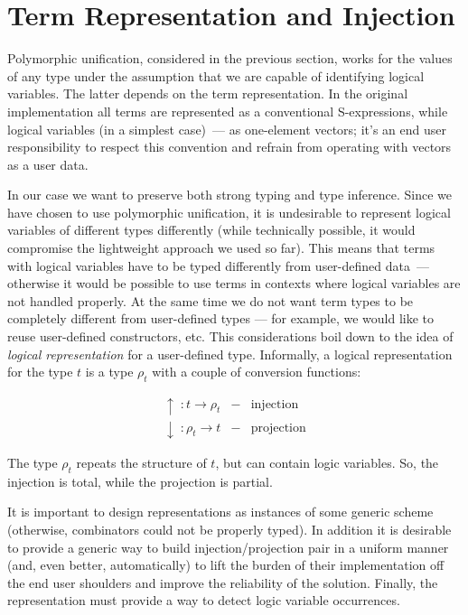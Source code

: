 
\section{Term Representation and Injection}
\label{sec:injection}

Polymorphic unification, considered in the previous section, works for the values of any type under the assumption that we
are capable of identifying logical variables. The latter depends on the term representation. In the original
implementation all terms are represented as a conventional S-expressions, while logical variables (in a simplest case)~--- as one-element vectors; it's an end user responsibility to respect this convention and refrain from operating
with vectors as a user data.

In our case we want to preserve both strong typing and type inference. Since we have chosen to use polymorphic
unification, it is undesirable to represent logical variables of different types differently (while technically
possible, it would compromise the lightweight approach we used so far). This means that terms with logical
variables have to be typed differently from user-defined data~--- otherwise it would be possible to use
terms in contexts where logical variables are not handled properly. At the same time we do not want term types
to be completely different from user-defined types --- for example, we would like to reuse user-defined constructors, etc.
This considerations boil down to the idea of \emph{logical representation} for a user-defined type. Informally,
a logical representation for the type $t$ is a type $\rho_t$ with a couple of conversion functions:

$$
\begin{array}{rcl}
   \uparrow  \;: t \to \rho_t & - & \mbox{injection}\\
   \downarrow\;: \rho_t \to t & - & \mbox{projection}
\end{array}
$$

The type $\rho_t$ repeats the structure of $t$, but can contain logic variables. So, the injection is total,
while the projection is partial.

It is important to design representations as instances of some generic scheme (otherwise, \miniKanren combinators
could not be properly typed). In addition it is desirable to provide a generic way to build
injection/projection pair in a uniform manner (and, even better, automatically) to lift the burden of
their implementation off the end user shoulders and improve the reliability of the solution. Finally,
the representation must provide a way to detect logic variable occurrences.


